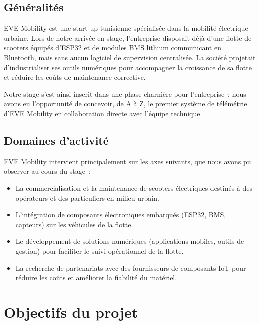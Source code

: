 \documentclass[12pt, a4paper]{report}
\begin{document}
\subsection{Généralités}

EVE Mobility est une start-up tunisienne spécialisée dans la mobilité électrique urbaine.
Lors de notre arrivée en stage, l'entreprise disposait déjà d'une flotte de scooters
équipés d'ESP32 et de modules BMS lithium communicant en Bluetooth, mais sans aucun
logiciel de supervision centralisée. La société projetait d'industrialiser ses outils
numériques pour accompagner la croissance de sa flotte et réduire les coûts de
maintenance corrective.

Notre stage s'est ainsi inscrit dans une phase charnière pour l'entreprise~: nous avons
eu l'opportunité de concevoir, de A à Z, le premier système de télémétrie d'EVE Mobility
en collaboration directe avec l'équipe technique.

\subsection{Domaines d'activité}

EVE Mobility intervient principalement sur les axes suivants, que nous avons pu observer
au cours du stage~:

\begin{itemize}
  \item La commercialisation et la maintenance de scooters électriques destinés à des
        opérateurs et des particuliers en milieu urbain.
  \item L'intégration de composants électroniques embarqués (ESP32, BMS, capteurs)
        sur les véhicules de la flotte.
  \item Le développement de solutions numériques (applications mobiles, outils de
        gestion) pour faciliter le suivi opérationnel de la flotte.
  \item La recherche de partenariats avec des fournisseurs de composants IoT pour
        réduire les coûts et améliorer la fiabilité du matériel.
\end{itemize}

\section{Objectifs du projet}
\end{document}
